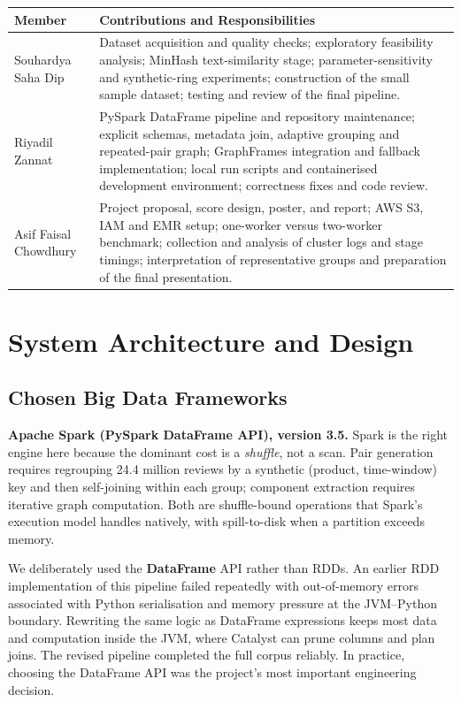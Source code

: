 \documentclass[12pt]{article}
\begin{document}
\begin{tabularx}{\textwidth}{@{}p{1.5in}>{\raggedright\arraybackslash}X@{}}
  \toprule
  \textbf{Member} & \textbf{Contributions and Responsibilities} \\
  \midrule
  Souhardya Saha Dip &
    Dataset acquisition and quality checks; exploratory feasibility analysis;
    MinHash text-similarity stage; parameter-sensitivity and synthetic-ring
    experiments; construction of the small sample dataset; testing and review
    of the final pipeline. \\
  \addlinespace
  Riyadil Zannat &
    PySpark DataFrame pipeline and repository maintenance; explicit schemas,
    metadata join, adaptive grouping and repeated-pair graph; GraphFrames
    integration and fallback implementation; local run scripts and
    containerised development environment; correctness fixes and code review. \\
  \addlinespace
  Asif Faisal Chowdhury &
    Project proposal, score design, poster, and report; AWS S3, IAM and EMR
    setup; one-worker versus two-worker benchmark; collection and analysis of
    cluster logs and stage timings; interpretation of representative groups
    and preparation of the final presentation. \\
  \bottomrule
\end{tabularx}

\section{System Architecture and Design}

\subsection{Chosen Big Data Frameworks}

\textbf{Apache Spark (PySpark DataFrame API), version 3.5.} Spark is the right
engine here because the dominant cost is a \emph{shuffle}, not a scan. Pair
generation requires regrouping 24.4 million reviews by a synthetic
(product, time-window) key and then self-joining within each group; component
extraction requires iterative graph computation. Both are
shuffle-bound operations that Spark's execution model handles natively, with
spill-to-disk when a partition exceeds memory.

We deliberately used the \textbf{DataFrame} API rather than RDDs. An earlier
RDD implementation of this pipeline failed repeatedly with out-of-memory
errors associated with Python serialisation and memory pressure at the
JVM--Python boundary. Rewriting the same logic as DataFrame expressions keeps
most data and computation inside the JVM, where Catalyst can prune columns and
plan joins. The revised pipeline completed the full corpus reliably. In
practice, choosing the DataFrame API was the project's most important
engineering decision.
\end{document}
